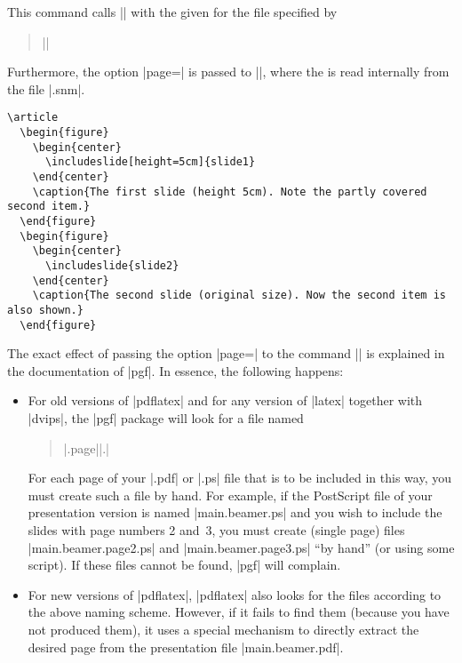 \begin{command}{}
  This command calls |\pgfimage| with the given  for the file specified by
  \begin{quote}
    |\setjobnamebeamerversion|
  \end{quote}
  Furthermore, the option |page=| is passed to |\pgfimage|, where the  is read internally from the file |.snm|.
  \example

\begin{verbatim}
\article
  \begin{figure}
    \begin{center}
      \includeslide[height=5cm]{slide1}
    \end{center}
    \caption{The first slide (height 5cm). Note the partly covered second item.}
  \end{figure}
  \begin{figure}
    \begin{center}
      \includeslide{slide2}
    \end{center}
    \caption{The second slide (original size). Now the second item is also shown.}
  \end{figure}
\end{verbatim}
\end{command}

The exact effect of passing the option |page=| to the command |\pgfimage| is explained in the documentation of |pgf|. In essence, the following happens:
\begin{itemize}
\item
  For old versions of |pdflatex| and for any version of |latex| together with |dvips|, the |pgf| package will look for a file named
  \begin{quote}
    |.page||.|
  \end{quote}
  For each page of your |.pdf| or |.ps| file that is to be included in this way, you must create such a file by hand. For example, if the PostScript file of your presentation version is named |main.beamer.ps| and you wish to include the slides with page numbers 2 and~3, you must create (single page) files |main.beamer.page2.ps| and |main.beamer.page3.ps| ``by hand'' (or using some script). If these files cannot be found, |pgf| will complain.
\item
  For new versions of |pdflatex|, |pdflatex| also looks for the files according to the above naming scheme. However, if it fails to find them (because you have not produced them), it uses a special mechanism to directly extract the desired page from the presentation file |main.beamer.pdf|.
\end{itemize}


